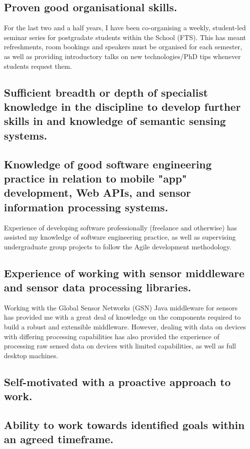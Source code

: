 \documentclass[10pt,a4paper]{article}
\begin{document}
\subsection{Proven good organisational skills.}
For the last two and a half years, I have been co-organising a weekly, student-led seminar series for postgradate students within the School (FTS). This has meant refreshments, room bookings and speakers must be organised for each semester, as well as providing introductory talks on new technologies/PhD tips whenever students request them.

\subsection{Sufficient breadth or depth of specialist knowledge in the discipline to develop further skills in and knowledge of semantic sensing systems.}


\subsection{Knowledge of good software engineering practice in relation to mobile "app" development, Web APIs, and sensor information processing systems.}
Experience of developing software professionally (freelance and otherwise) has assisted my knowledge of software engineering practice, as well as supervising undergraduate group projects to follow the Agile development methodology.

\subsection{Experience of working with sensor middleware and sensor data processing libraries.}
Working with the Global Sensor Networks (GSN) Java middleware for sensors has provided me with a great deal of knowledge on the components required to build a robust and extensible middleware. However, dealing with data on devices with differing processing capabilities has also provided the experience of processing raw sensed data on devices with limited capabilities, as well as full desktop machines.

\subsection{Self-motivated with a proactive approach to work. }


\subsection{Ability to work towards identified goals within an agreed timeframe. }
\end{document}
